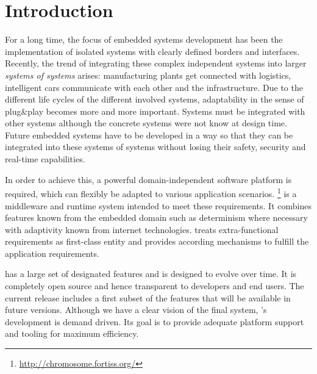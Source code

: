 %
% 
%
%
%
%

\section{Introduction} \label{sec:intro}

For a long time, the focus of embedded systems development has been the implementation of isolated systems with clearly defined borders and interfaces.
Recently, the trend of integrating these complex independent systems into larger \emph{systems of systems} arises:
manufacturing plants get connected with logistics, intelligent cars communicate with each other and the infrastructure. 
Due to the different life cycles of the different involved systems, adaptability in the sense of plug\&play becomes more and more important. Systems must 
be integrated with other systems although the concrete systems were not know at design time. Future embedded systems have to be developed in a way so 
that they can be integrated into these systems of systems without losing their safety, security and real-time capabilities. 

In order to achieve this, a powerful domain-independent software platform is required,
which can flexibly be adapted to various application scenarios.
\xme\footnote{\url{http://chromosome.fortiss.org/}} is a middleware and runtime system intended to meet these requirements. It combines features known
from the embedded domain such as determinism where necessary with adaptivity known from internet technologies. \xme treats extra-functional requirements as 
first-class entity and provides according mechanisms to fulfill the application requirements.

\xme has a large set of designated features and is designed to evolve over time.
It is completely open source and hence transparent to developers and end users.
The current release includes a first subset of the features that will be available in future versions.
Although we have a clear vision of the final system, \xme's development is demand driven.
Its goal is to provide adequate platform support and tooling for maximum efficiency.

